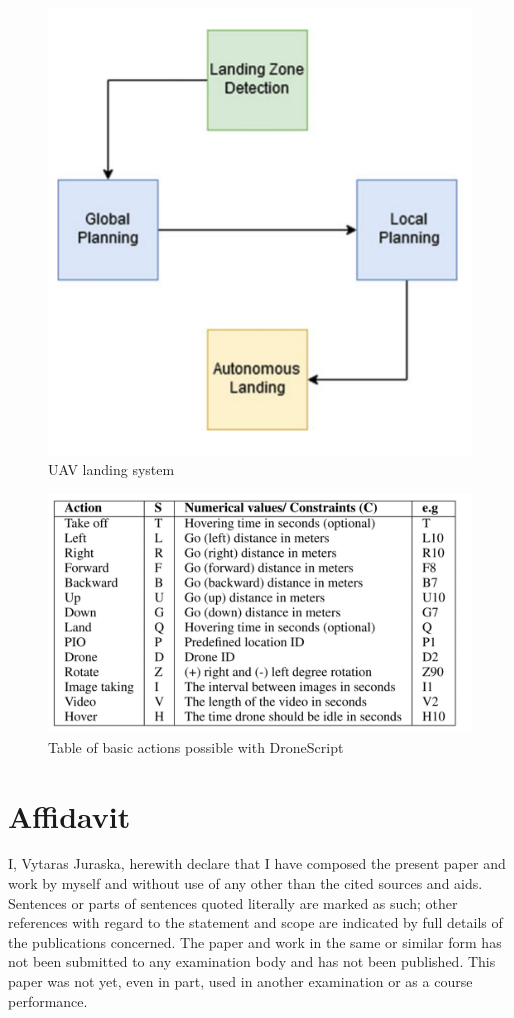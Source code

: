 \documentclass[11pt,a4paper,footinclude=true,headinclude=true, oneside]{scrbook}
\begin{document}
\begin{figure}[htbp]
\centerline{\includegraphics[scale=0.7]{UAV_Landing.png}}
\caption{UAV landing system \cite{koubaa_robot_2021}}
\label{uavlanding}
\end{figure}

\begin{figure}[htbp]
\centerline{\includegraphics[scale=0.5]{DroneScript_Variables.png}}
\caption{Table of basic actions possible with DroneScript \cite{alwateer_enabling_2019}}
\label{dronescript}
\end{figure}


\chapter{Affidavit}
I, Vytaras Juraska, herewith declare that I have composed the present paper and work by myself and without use of any other than the cited sources and aids. Sentences or parts of sentences quoted literally are marked as such; other references with regard to the statement and scope are indicated by full details of the publications concerned. The paper and work in the same or similar form has not been submitted to any examination body and has not been published. This paper was not yet, even in part, used in another examination or as a course performance.
\end{document}
